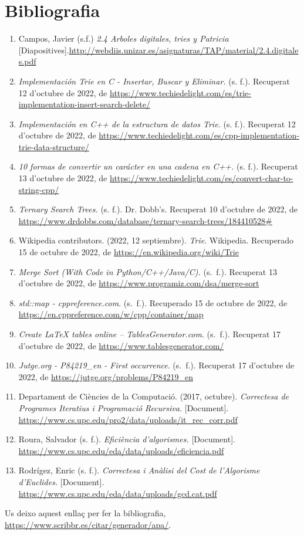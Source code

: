 \documentclass[titlepage]{article}
\begin{document}
\section{Bibliografia}
\begin{enumerate}
    \item Campos, Javier (s.f.) \textit{2.4 Arboles digitales, tries y Patricia} [Diapositives].\url{http://webdiis.unizar.es/asignaturas/TAP/material/2.4.digitales.pdf }
    \item \textit{Implementación Trie en C - Insertar, Buscar y Eliminar.} (s. f.). Recuperat 12 d'octubre de 2022, de \url{https://www.techiedelight.com/es/trie-implementation-insert-search-delete/}
    \item \textit{Implementación en C++ de la estructura de datos Trie.} (s. f.). Recuperat 12 d'octubre de 2022, de \url{https://www.techiedelight.com/es/cpp-implementation-trie-data-structure/}
    \item \textit{10 formas de convertir un carácter en una cadena en C++.} (s. f.). Recuperat 13 d'octubre de 2022, de \url{https://www.techiedelight.com/es/convert-char-to-string-cpp/}
    \item \textit{Ternary Search Trees.} (s. f.). Dr. Dobb's. Recuperat 10 d'octubre de 2022, de \url{https://www.drdobbs.com/database/ternary-search-trees/184410528#}
    \item Wikipedia contributors. (2022, 12 septiembre). \textit{Trie}. Wikipedia. Recuperado 15 de octubre de 2022, de \url{https://en.wikipedia.org/wiki/Trie}
    \item \textit{Merge Sort (With Code in Python/C++/Java/C).} (s. f.). Recuperat 13 d'octubre de 2022, de \url{https://www.programiz.com/dsa/merge-sort}
    \item \textit{std::map - cppreference.com}. (s. f.). Recuperado 15 de octubre de 2022, de
    \url{https://en.cppreference.com/w/cpp/container/map}
    \item \textit{Create LaTeX tables online – TablesGenerator.com}. (s. f.). Recuperat 17 d'octubre de 2022, de \url{https://www.tablesgenerator.com/}

    \item \textit{Jutge.org - P84219\_en - First occurrence}. (s. f.). Recuperat 17 d'octubre de 2022, de \url{https://jutge.org/problems/P84219_en}

    \item Departament de Ciències de la Computació. (2017, octubre). \textit{Correctesa de Programes Iteratius i Programació Recursiva.} [Document]. \url{https://www.cs.upc.edu/pro2/data/uploads/it_rec_corr.pdf}

    \item Roura, Salvador (s. f.). \textit{Eficiència d'algorismes.} [Document]. \url{https://www.cs.upc.edu/eda/data/uploads/eficiencia.pdf}

    \item Rodrígez, Enric (s. f.). \textit{Correctesa i Anàlisi del Cost de l'Algorisme d'Euclides.} [Document]. \url{https://www.cs.upc.edu/eda/data/uploads/gcd.cat.pdf}
    
\end{enumerate}

Us deixo aquest enllaç per fer la bibliografia, \url{https://www.scribbr.es/citar/generador/apa/}.
\end{document}
